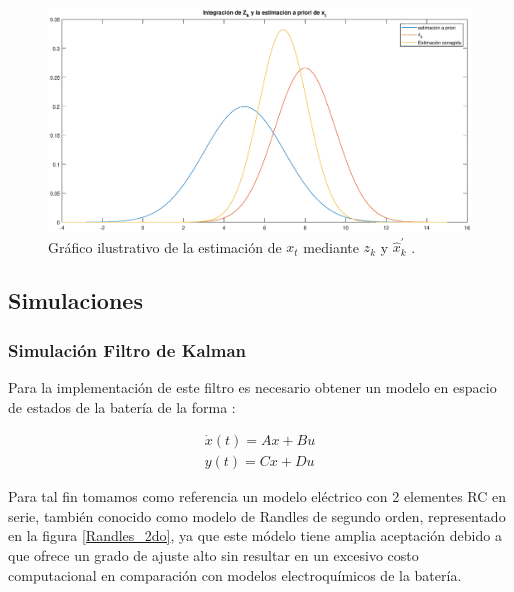 \documentclass[10pt,a4paper]{article}
\begin{document}
\begin{figure}[h!]
    \begin{center}
	\includegraphics[width=1\textwidth]{KF_Integration_concept.eps}
	\caption{Gráfico ilustrativo de la estimación de $x_{t}$ mediante $z_k$ y
	$\hat{x}^\prime_k$ .}
	\label{KF_Integration_concept}
    \end{center}
\end{figure}
\FloatBarrier

\subsection{Simulaciones}

\subsubsection{Simulación Filtro de Kalman}

Para la implementación de este filtro es necesario obtener un modelo en espacio
de estados de la batería de la forma :

\begin{align}
    \dot{x}(t) = Ax+Bu	\nonumber\\
    y(t)=Cx+Du
    \label{SS_Model_generic}	
\end{align}

Para tal fin tomamos como referencia un modelo eléctrico con 2 elementes RC en
serie, también conocido como modelo de Randles de segundo orden, representado en
la figura \ref{Randles_2do}, ya que este módelo tiene amplia aceptación debido a
que ofrece un grado de ajuste alto sin resultar en un excesivo costo
computacional en comparación con modelos electroquímicos de la batería.
\end{document}
